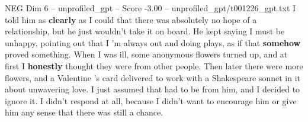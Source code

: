 \begin{textsample}{NEG Dim 6 – unprofiled\_gpt – Score -3.00 – unprofiled\_gpt/t001226\_gpt.txt}  \label{ex:f6_neg_025}
I told him as \textbf{clearly} as I could that there was absolutely no hope of a relationship, but he just wouldn't take it on board.
He kept saying I must be unhappy, pointing out that I ’m always out and doing plays, as if that \textbf{somehow} proved something.
When I was ill, some anonymous flowers turned up, and at first I \textbf{honestly} thought they were from other people.
Then later there were more flowers, and a Valentine ’s card delivered to work with a Shakespeare sonnet in it about unwavering love.
I just assumed that had to be from him, and I decided to ignore it.
I didn't respond at all, because I didn't want to encourage him or give him any sense that there was still a chance.

\end{textsample}
